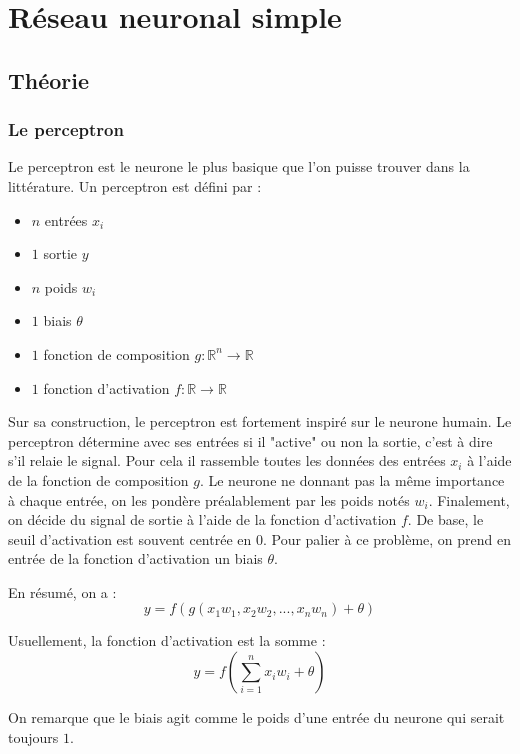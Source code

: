 \chapter{Réseau neuronal simple}

\section{Théorie}

\subsection{Le perceptron}

Le perceptron est le neurone le plus basique que l'on puisse trouver dans la
littérature. Un perceptron est défini par :
\begin{itemize}
\item $n$ entrées $x_i$
\item $1$ sortie $y$
\item $n$ poids $w_i$
\item $1$ biais $\theta$
\item $1$ fonction de composition $g : \mathbb{R}^n \to \mathbb{R}$
\item $1$ fonction d'activation $f : \mathbb{R} \to \mathbb{R}$
\end{itemize}

\vspace{\parskip}
Sur sa construction, le perceptron est fortement inspiré sur le neurone humain.
Le perceptron détermine avec ses entrées si il "active" ou non la sortie, c'est
à dire s'il relaie le signal. Pour cela il rassemble toutes les données des
entrées $x_i$ à l'aide de la fonction de composition $g$. Le neurone ne donnant
pas la même importance à chaque entrée, on les pondère préalablement par les
poids notés $w_i$. Finalement, on décide du signal de sortie à l'aide de la
fonction d'activation $f$. De base, le seuil d'activation est souvent centrée
en $0$. Pour palier à ce problème, on prend en entrée de la fonction
d'activation un biais $\theta$.

\medskip

En résumé, on a :
\[y = f(g(x_1w_1, x_2w_2, ... , x_nw_n) + \theta) \]

\medskip

Usuellement, la fonction d'activation est la somme :
\[y = f(\sum_{i=1}^n x_iw_i + \theta) \]

\medskip

On remarque que le biais agit comme le poids d'une entrée du neurone qui serait
toujours $1$.

